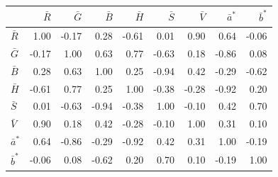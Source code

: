 \scriptsize
\begin{tabular}{lrrrrrrrr}
\toprule
 & $\bar R$ & $\bar G$ & $\bar B$ & $\bar H$ & $\bar S$ & $\bar V$ & $\bar a^*$ & $\bar b^*$ \\
\midrule
$\bar R$ & 1.00 & -0.17 & 0.28 & -0.61 & 0.01 & 0.90 & 0.64 & -0.06 \\
$\bar G$ & -0.17 & 1.00 & 0.63 & 0.77 & -0.63 & 0.18 & -0.86 & 0.08 \\
$\bar B$ & 0.28 & 0.63 & 1.00 & 0.25 & -0.94 & 0.42 & -0.29 & -0.62 \\
$\bar H$ & -0.61 & 0.77 & 0.25 & 1.00 & -0.38 & -0.28 & -0.92 & 0.20 \\
$\bar S$ & 0.01 & -0.63 & -0.94 & -0.38 & 1.00 & -0.10 & 0.42 & 0.70 \\
$\bar V$ & 0.90 & 0.18 & 0.42 & -0.28 & -0.10 & 1.00 & 0.31 & 0.10 \\
$\bar a^*$ & 0.64 & -0.86 & -0.29 & -0.92 & 0.42 & 0.31 & 1.00 & -0.19 \\
$\bar b^*$ & -0.06 & 0.08 & -0.62 & 0.20 & 0.70 & 0.10 & -0.19 & 1.00 \\
\bottomrule
\end{tabular}
